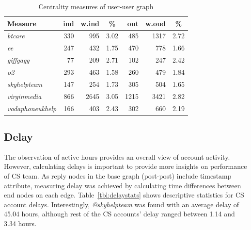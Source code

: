 \documentclass[sigconf]{acmart}
\begin{document}
\begin{table}[!h]
\centering
\begin{tabularx}{\columnwidth}{l|rrc|rrc}
\toprule
\textbf{Measure} & \textbf{ind} & \textbf{w.ind} & \textbf{\%} & \textbf{out} & \textbf{w.oud} & \textbf{\%}\\ 
\midrule
{\emph{btcare}} & 330 & 995 & 3.02 & 485 & 1317 & 2.72\\
{\emph{ee}} & 247 & 432 & 1.75 & 470 & 778 & 1.66 \\
{\emph{giffgagg}} & 77 & 209 & 2.71 & 102 & 247 & 2.42 \\ 
{\emph{o2}} & 293 & 463 & 1.58 & 260 & 479 & 1.84 \\
{\emph{skyhelpteam}} & 147 & 254 & 1.73 & 305 & 504 & 1.65\\
{\emph{virginmedia}} & 866 & 2645 & 3.05 & 1215 & 3421 & 2.82\\
{\emph{vodaphoneukhelp}} & 166 & 403 & 2.43 & 302 & 660 & 2.19\\
\bottomrule
\end{tabularx}
\caption{Centrality measures of user-user graph}
\label{tbl:uucentralitymeasures}
\end{table}

\subsection{Delay}\label{results_delay}

The observation of active hours provides an overall view of account
activity. However, calculating delays is important to provide more
insights on performance of CS team. As reply nodes in the base graph
(post-post) include timestamp attribute, measuring delay was achieved
by calculating time differences between end nodes on each
edge. Table~\ref{tbl:delaystats} shows descriptive statistics for CS
account delays. Interestingly, {\emph{@skyhelpteam}} was found with an
average delay of 45.04 hours, although rest of the CS accounts' delay
ranged between 1.14 and 3.34 hours.

\end{document}
